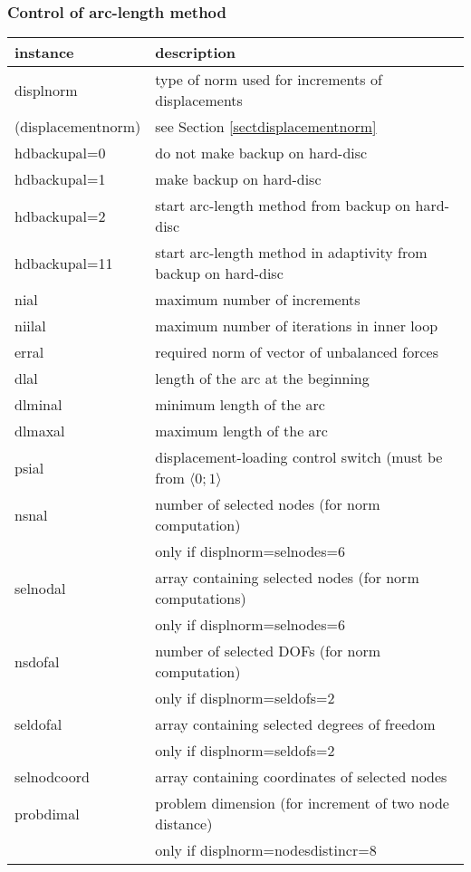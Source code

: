 \subsubsection{Control of arc-length method}

\begin{tabular}{|l|l|}
\hline
instance & description
\\ \hline \hline
displnorm & type of norm used for increments of displacements
\\
(displacementnorm) & see Section \ref{sectdisplacementnorm}
\\ \hline \hline
hdbackupal=0 & do not make backup on hard-disc
\\ \hline
hdbackupal=1 & make backup on hard-disc
\\ \hline
hdbackupal=2 & start arc-length method from backup on hard-disc
\\ \hline
hdbackupal=11 & start arc-length method in adaptivity from backup on hard-disc
\\ \hline \hline
nial &  maximum number of increments
\\ \hline
niilal & maximum number of iterations in inner loop
\\ \hline
erral & required norm of vector of unbalanced forces
\\ \hline
dlal & length of the arc at the beginning
\\ \hline
dlminal & minimum length of the arc
\\ \hline
dlmaxal & maximum length of the arc
\\ \hline
psial & displacement-loading control switch (must be from $\langle0;1\rangle$
\\ \hline \hline
nsnal & number of selected nodes (for norm computation)
\\
 & only if displnorm=selnodes=6
\\ \hline
selnodal & array containing selected nodes (for norm computations)
\\
 & only if displnorm=selnodes=6
\\ \hline \hline
nsdofal & number of selected DOFs (for norm computation)
\\
 & only if displnorm=seldofs=2
\\ \hline
seldofal & array containing selected degrees of freedom
\\
 & only if displnorm=seldofs=2
\\ \hline \hline
selnodcoord & array containing coordinates of selected nodes
\\ \hline
probdimal & problem dimension (for increment of two node distance)
\\
 & only if displnorm=nodesdistincr=8
\\ \hline
\end{tabular}



